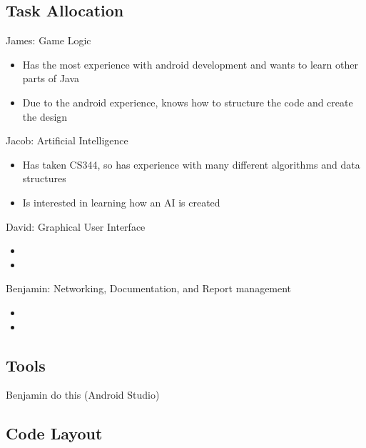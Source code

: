 \documentclass{article}
\begin{document}
\subsection{Task Allocation}
James: Game Logic
\begin{itemize}
  \item Has the most experience with android development and wants to learn other parts of Java
  \item Due to the android experience, knows how to structure the code and create the design
\end{itemize}\newline
Jacob: Artificial Intelligence
\begin{itemize}
  \item Has taken CS344, so has experience with many different algorithms and data structures
  \item Is interested in learning how an AI is created
\end{itemize}\newline
David: Graphical User Interface
\begin{itemize}
  \item 
  \item 
\end{itemize}\newline
Benjamin: Networking, Documentation, and Report management
\begin{itemize}
  \item 
  \item 
\end{itemize}\newline

\subsection{Tools}
Benjamin do this (Android Studio)

\subsection{Code Layout}
\end{document}
